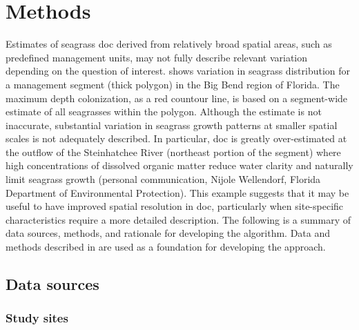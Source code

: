 \documentclass[letterpaper,12pt,oneside]{article}\usepackage[]{graphicx}\usepackage[]{color}
\begin{document}
\section{Methods}

Estimates of seagrass \ac{doc} derived from relatively broad spatial areas, such as predefined management units, may not fully describe relevant variation depending on the question of interest.  shows variation in seagrass distribution for a management segment (thick polygon) in the Big Bend region of Florida.  The maximum depth colonization, as a red countour line, is based on a segment-wide estimate of all seagrasses within the polygon.  Although the estimate is not inaccurate, substantial variation in seagrass growth patterns at smaller spatial scales is not adequately described. In particular, \ac{doc} is greatly over-estimated at the outflow of the Steinhatchee River (northeast portion of the segment) where high concentrations of dissolved organic matter reduce water clarity and naturally limit seagrass growth (personal communication, Nijole Wellendorf, Florida Department of Environmental Protection).  This example suggests that it may be useful to have improved spatial resolution in \ac{doc}, particularly when site-specific characteristics require a more detailed description.  The following is a summary of data sources, methods, and rationale for developing the algorithm.  Data and methods described in  are used as a foundation for developing the approach.

\subsection{Data sources}

\subsubsection{Study sites}
\end{document}
